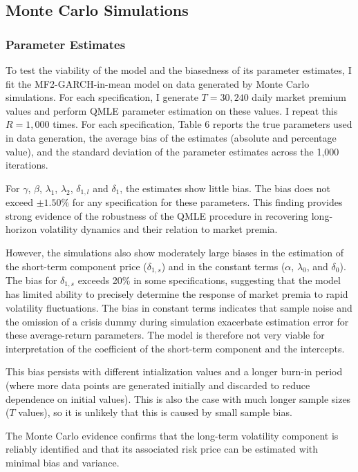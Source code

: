 \documentclass[12pt]{article}
\begin{document}
\subsection{Monte Carlo Simulations}
\subsubsection{Parameter Estimates}
To test the viability of the model and the biasedness of its parameter estimates, I fit the MF2-GARCH-in-mean model on data generated by Monte Carlo simulations. For each specification, I generate $T=30,240$ daily market premium values and perform QMLE parameter estimation on these values. I repeat this $R=1,000$ times. For each specification, Table 6 reports the true parameters used in data generation, the average bias of the estimates (absolute and percentage value), and the standard deviation of the parameter estimates across the 1,000 iterations.\par
For $\gamma$, $\beta$, $\lambda_1$, $\lambda_2$, $\delta_{1,l}$ and $\delta_1$, the estimates show little bias. The bias does not exceed $\pm1.50\%$ for any specification for these parameters. This finding provides strong evidence of the robustness of the QMLE procedure in recovering long-horizon volatility dynamics and their relation to market premia.\par
However, the simulations also show moderately large biases in the estimation of the short-term component price ($\delta_{1,s}$) and in the constant terms ($\alpha$, $\lambda_0$, and $\delta_0$). The bias for $\delta_{1,s}$ exceeds 20\% in some specifications, suggesting that the model has limited ability to precisely determine the response of market premia to rapid volatility fluctuations. The bias in constant terms indicates that sample noise and the omission of a crisis dummy during simulation exacerbate estimation error for these average-return parameters. The model is therefore not very viable for interpretation of the coefficient of the short-term component and the intercepts.\par
This bias persists with different intialization values and a longer burn-in period (where more data points are generated initially and discarded to reduce dependence on initial values). This is also the case with much longer sample sizes ($T$ values), so it is unlikely that this is caused by small sample bias.\par
The Monte Carlo evidence confirms that the long-term volatility component is reliably identified and that its associated risk price can be estimated with minimal bias and variance.
\end{document}
